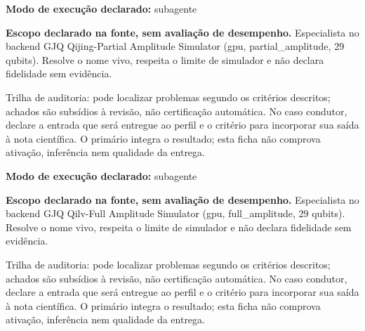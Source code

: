 \begin{arquitetura}
\textbf{Modo de execução declarado:} subagente
\end{arquitetura}


\begin{descricao}
\textbf{Escopo declarado na fonte, sem avaliação de desempenho.}
Especialista no backend GJQ Qijing-Partial Amplitude Simulator (gpu, partial\_amplitude, 29 qubits). Resolve o nome vivo, respeita o limite de simulador e não declara fidelidade sem evidência.
\end{descricao}

\begin{funcao}
Trilha de auditoria: pode localizar problemas segundo os critérios descritos; achados são subsídios à revisão, não certificação automática. No caso condutor, declare a entrada que será entregue ao perfil e o critério para incorporar sua saída à nota científica. O primário integra o resultado; esta ficha não comprova ativação, inferência nem qualidade da entrega.
\end{funcao}

\begin{arquitetura}
\textbf{Modo de execução declarado:} subagente
\end{arquitetura}


\begin{descricao}
\textbf{Escopo declarado na fonte, sem avaliação de desempenho.}
Especialista no backend GJQ Qilv-Full Amplitude Simulator (gpu, full\_amplitude, 29 qubits). Resolve o nome vivo, respeita o limite de simulador e não declara fidelidade sem evidência.
\end{descricao}

\begin{funcao}
Trilha de auditoria: pode localizar problemas segundo os critérios descritos; achados são subsídios à revisão, não certificação automática. No caso condutor, declare a entrada que será entregue ao perfil e o critério para incorporar sua saída à nota científica. O primário integra o resultado; esta ficha não comprova ativação, inferência nem qualidade da entrega.
\end{funcao}

